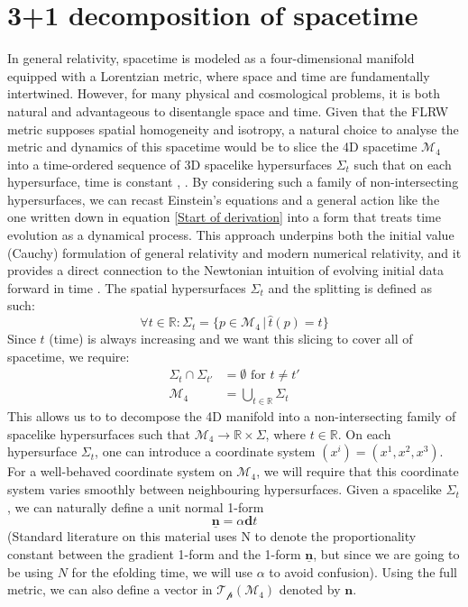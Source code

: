 \documentclass[aps,prd,reprint,preprintnumbers,showpacs,floatfix,nofootinbib,superscript address]{revtex4-2}
\begin{document}
\section{3+1 decomposition of spacetime} \label{3+1 decomposition of spacetime}
In general relativity, spacetime is modeled as a four-dimensional manifold equipped with a Lorentzian metric, where space and time are fundamentally intertwined. However, for many physical and cosmological problems, it is both natural and advantageous to disentangle space and time. Given that the FLRW metric supposes spatial homogeneity and isotropy, a natural choice to analyse the metric and dynamics of this spacetime would be to slice the 4D spacetime $\mathcal{M}_4$ into a time-ordered sequence of 3D spacelike hypersurfaces $\Sigma_t$ such that on each hypersurface, time is constant \cite{baumann2012tasilecturesinflation}, 
\cite{gourgoulhon_31_2007}. By considering such a family of non-intersecting hypersurfaces, we can recast Einstein's equations and a general action like the one written down in equation \ref{Start of derivation} into a form that treats time evolution as a dynamical process. This approach underpins both the initial value (Cauchy) formulation of general relativity and modern numerical relativity, and it provides a direct connection to the Newtonian intuition of evolving initial data forward in time \cite{choquet-bruhat_global_1969}. The spatial hypersurfaces $\Sigma_t$ and the splitting is defined as such:
\begin{equation}
    \forall t \in \mathbb{R} : \Sigma_t = \{p \in \mathcal{M}_4 \, | \, \hat{t} (p) = t\} \nonumber
\end{equation}
Since $t$ (time) is always increasing and we want this slicing to cover all of spacetime, we require:
\begin{align}
    \Sigma_t \cap \Sigma_{t'} &= \emptyset \,\, \text{for}\,\, t \neq t' \nonumber \\
    \mathcal{M}_4 &= \bigcup_{t \in \mathbb{R}} \Sigma_t \nonumber
\end{align}
This allows us to to decompose the 4D manifold into a non-intersecting family of spacelike hypersurfaces such that $\mathcal{M}_4 \rightarrow \mathbb{R} \times \Sigma$, where $t \in \mathbb{R}$. On each hypersurface $\Sigma_t$, one can introduce a coordinate system $(x^i) = (x^1,x^2,x^3)$. For a well-behaved coordinate system on $\mathcal{M}_4$, we will require that this coordinate system varies smoothly between neighbouring hypersurfaces. Given a spacelike $\Sigma_t$, we can naturally define a unit normal 1-form 
\begin{equation} \label{unit 1-form}
    \underline{\bm{n}} =  \alpha \textbf{d}t    
\end{equation}
(Standard literature on this material uses N to denote the proportionality constant between the gradient 1-form and the 1-form $\underline{\bm{n}}$, but since we are going to be using $N$ for the efolding time, we will use $\alpha$ to avoid confusion). Using the full metric, we can also define a vector in $\mathcal{T_p}(\mathcal{M}_4)$ denoted by $\bm{n}$.
\end{document}
